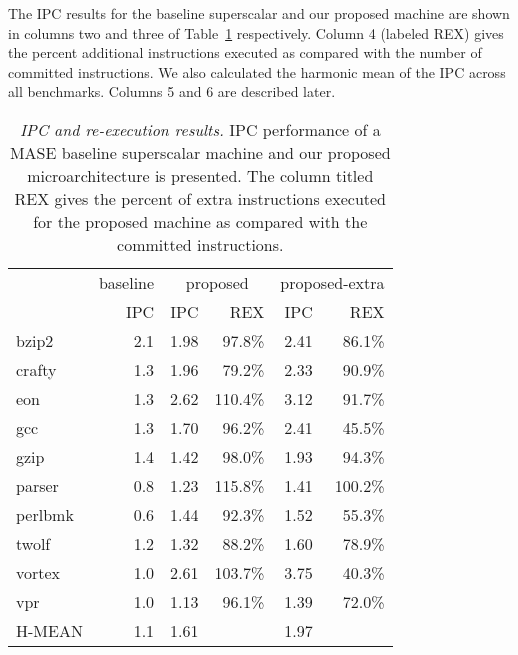 \documentclass[10pt,twocolumn,dvips]{article}
\begin{document}
The IPC results for the baseline superscalar and our proposed
machine are shown in columns two and three of Table~\ref{tab:results}
respectively.
Column 4 (labeled REX) gives the percent additional instructions
executed as compared with the number of committed 
instructions.
We also calculated the harmonic mean of the IPC
across all benchmarks.
Columns 5 and 6 are described later.
%
\begin{table}[p]
\begin{center}
\caption{{\em IPC and re-execution results.}
IPC performance of a MASE baseline superscalar machine and our
proposed microarchitecture is presented.
The column titled REX gives the percent of 
extra instructions executed for the proposed machine as compared with 
the committed instructions.}
\label{tab:results}
\vspace{+0.1in}
\scriptsize {
\begin{tabular}{|l||r|r|r|r|r|}
\hline
 & baseline &
 \multicolumn{2}{c|}{proposed} &
 \multicolumn{2}{c|}{proposed-extra} \\
\cline{2-6}
 & IPC & IPC & REX & IPC & REX \\

\hline
bzip2&
2.1 & 1.98 & 97.8\% & 2.41 & 86.1\% \\

\hline
crafty&
1.3 & 1.96 & 79.2\% & 2.33 & 90.9\% \\

\hline
eon&
1.3 & 2.62 & 110.4\% & 3.12 & 91.7\% \\

\hline
gcc&
1.3 & 1.70 & 96.2\% & 2.41 & 45.5\% \\

\hline
gzip&
1.4 & 1.42 & 98.0\% & 1.93 & 94.3\% \\

\hline
parser&
0.8 & 1.23 & 115.8\% & 1.41 & 100.2\% \\

\hline
perlbmk&
0.6 & 1.44 & 92.3\% & 1.52 & 55.3\% \\

\hline
twolf&
1.2 & 1.32 & 88.2\% & 1.60 & 78.9\% \\

\hline
vortex&
1.0 & 2.61 & 103.7\% & 3.75 & 40.3\% \\

\hline
vpr&
1.0 & 1.13 & 96.1\% & 1.39 & 72.0\% \\

\hline
H-MEAN&
1.1 & 1.61 & & 1.97 & \\

\hline
\end{tabular}
}
\end{center}
\end{table}
\end{document}

